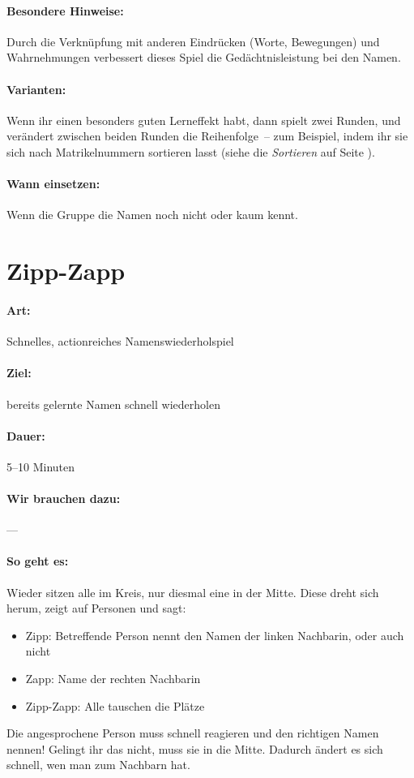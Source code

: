 \paragraph{Besondere Hinweise:} Durch die Verknüpfung mit anderen Eindrücken (Worte, Bewegungen) und Wahrnehmungen verbessert dieses Spiel die Gedächtnisleistung bei den Namen.
\paragraph{Varianten:} Wenn ihr einen besonders guten Lerneffekt habt, dann spielt zwei Runden, und verändert zwischen beiden Runden die Reihenfolge~-- zum Beispiel, indem ihr sie sich nach Matrikelnummern sortieren lasst (siehe die \emph{Sortieren} auf Seite \pageref{sortieren}).
\paragraph{Wann einsetzen:} Wenn die Gruppe die Namen noch nicht oder kaum kennt.

\section{Zipp-Zapp}
\paragraph{Art:} Schnelles, actionreiches Namenswiederholspiel
\paragraph{Ziel:} bereits gelernte Namen schnell wiederholen
\paragraph{Dauer:} 5--10 Minuten
\paragraph{Wir brauchen dazu:} ---
\paragraph{So geht es:}
Wieder sitzen alle im Kreis, nur diesmal eine in der Mitte. Diese dreht sich herum, zeigt auf Personen und sagt:
\begin{itemize}
\item Zipp: Betreffende Person nennt den Namen der linken Nachbarin, oder auch nicht
\item Zapp: Name der rechten Nachbarin
\item Zipp-Zapp: Alle tauschen die Plätze
\end{itemize}
Die angesprochene Person muss schnell reagieren und den richtigen Namen nennen! Gelingt ihr das nicht, muss sie in die Mitte. Dadurch ändert es sich schnell, wen man zum Nachbarn hat.
